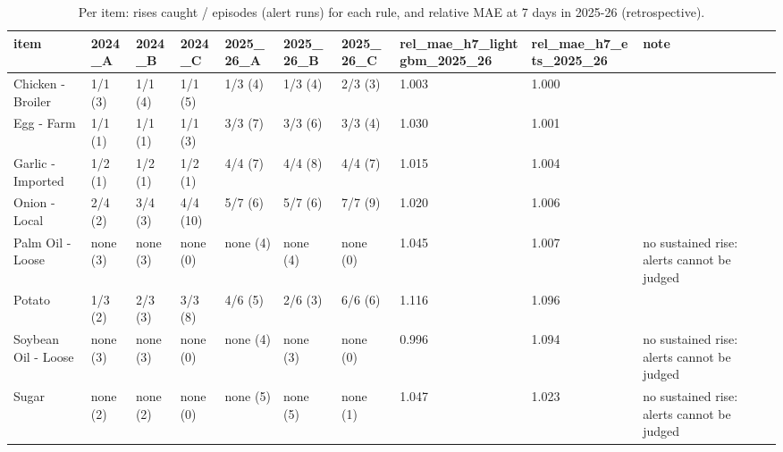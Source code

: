 \begin{table}
\caption{Per item: rises caught / episodes (alert runs) for each rule, and relative MAE at 7 days in 2025-26 (retrospective).}
\label{tab:r6}
\begin{tabular}{llllllllll}
\toprule
item & 2024\_A & 2024\_B & 2024\_C & 2025\_26\_A & 2025\_26\_B & 2025\_26\_C & rel\_mae\_h7\_lightgbm\_2025\_26 & rel\_mae\_h7\_ets\_2025\_26 & note \\
\midrule
Chicken - Broiler & 1/1 (3) & 1/1 (4) & 1/1 (5) & 1/3 (4) & 1/3 (4) & 2/3 (3) & 1.003 & 1.000 &  \\
Egg - Farm & 1/1 (1) & 1/1 (1) & 1/1 (3) & 3/3 (7) & 3/3 (6) & 3/3 (4) & 1.030 & 1.001 &  \\
Garlic - Imported & 1/2 (1) & 1/2 (1) & 1/2 (1) & 4/4 (7) & 4/4 (8) & 4/4 (7) & 1.015 & 1.004 &  \\
Onion - Local & 2/4 (2) & 3/4 (3) & 4/4 (10) & 5/7 (6) & 5/7 (6) & 7/7 (9) & 1.020 & 1.006 &  \\
Palm Oil - Loose & none (3) & none (3) & none (0) & none (4) & none (4) & none (0) & 1.045 & 1.007 & no sustained rise: alerts cannot be judged \\
Potato & 1/3 (2) & 2/3 (3) & 3/3 (8) & 4/6 (5) & 2/6 (3) & 6/6 (6) & 1.116 & 1.096 &  \\
Soybean Oil - Loose & none (3) & none (3) & none (0) & none (4) & none (3) & none (0) & 0.996 & 1.094 & no sustained rise: alerts cannot be judged \\
Sugar & none (2) & none (2) & none (0) & none (5) & none (5) & none (1) & 1.047 & 1.023 & no sustained rise: alerts cannot be judged \\
\bottomrule
\end{tabular}
\end{table}
